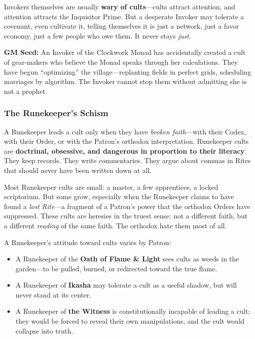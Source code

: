 Invokers themselves are usually \textbf{wary of cults}---cults attract attention, and attention attracts the Inquisitor Prime. But a desperate Invoker may tolerate a covenant, even cultivate it, telling themselves it is just a network, just a favor economy, just a few people who owe them. It never stays \textit{just}.

\textbf{GM Seed:} An Invoker of the Clockwork Monad has accidentally created a cult of gear-makers who believe the Monad speaks through her calculations. They have begun ``optimizing'' the village---replanting fields in perfect grids, scheduling marriages by algorithm. The Invoker cannot stop them without admitting she is not a prophet.

\subsubsection*{The Runekeeper's Schism}

A Runekeeper leads a cult only when they have \textit{broken faith}---with their Codex, with their Order, or with the Patron's orthodox interpretation. Runekeeper cults are \textbf{doctrinal, obsessive, and dangerous in proportion to their literacy}. They keep records. They write commentaries. They argue about commas in Rites that should never have been written down at all.

Most Runekeeper cults are small: a master, a few apprentices, a locked scriptorium. But some grow, especially when the Runekeeper claims to have found a \textit{lost Rite}---a fragment of a Patron's power that the orthodox Orders have suppressed. These cults are heresies in the truest sense: not a different faith, but a different \textit{reading} of the same faith. The orthodox hate them most of all.

A Runekeeper's attitude toward cults varies by Patron:
\begin{itemize}
  \item A Runekeeper of the \textbf{Oath of Flame \& Light} sees cults as weeds in the garden---to be pulled, burned, or redirected toward the true flame.
  \item A Runekeeper of \textbf{Ikasha} may tolerate a cult as a useful shadow, but will never stand at its center.
  \item A Runekeeper of \textbf{the Witness} is constitutionally incapable of leading a cult; they would be forced to reveal their own manipulations, and the cult would collapse into truth.
\end{itemize}

